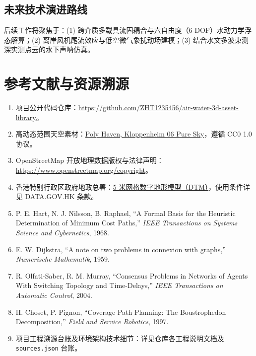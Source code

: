 \documentclass[UTF8,a4paper,11pt,fontset=fandol]{ctexart}
\newcommand{\repo}{https://github.com/ZHT1235456/air-water-3d-asset-library}
\begin{document}
\subsection{未来技术演进路线}
后续工作将聚焦于：(1) 跨介质多载具流固耦合与六自由度（6-DOF）水动力学浮态解算；(2) 离岸风机尾流效应与低空微气象扰动场建模；(3) 结合水文多波束测深实测点云的水下声呐仿真。

\section*{参考文献与资源溯源}
\begin{enumerate}\small
\item 项目公开代码仓库：\url{\repo}。
\item 高动态范围天空素材：\href{https://polyhaven.com/a/kloppenheim_06_puresky}{Poly Haven, Kloppenheim 06 Pure Sky}，遵循 CC0 1.0 协议。
\item OpenStreetMap 开放地理数据版权与法律声明：\url{https://www.openstreetmap.org/copyright}。
\item 香港特别行政区政府地政总署：\href{https://data.gov.hk/en-data/dataset/hk-landsd-openmap-5m-grid-dtm}{5 米网格数字地形模型（DTM）}，使用条件详见 DATA.GOV.HK 条款。
\item P. E. Hart, N. J. Nilsson, B. Raphael, ``A Formal Basis for the Heuristic Determination of Minimum Cost Paths,'' \textit{IEEE Transactions on Systems Science and Cybernetics}, 1968.
\item E. W. Dijkstra, ``A note on two problems in connexion with graphs,'' \textit{Numerische Mathematik}, 1959.
\item R. Olfati-Saber, R. M. Murray, ``Consensus Problems in Networks of Agents With Switching Topology and Time-Delays,'' \textit{IEEE Transactions on Automatic Control}, 2004.
\item H. Choset, P. Pignon, ``Coverage Path Planning: The Boustrophedon Decomposition,'' \textit{Field and Service Robotics}, 1997.
\item 项目工程溯源台账及环境架构技术细节：详见仓库各工程说明文档及 \texttt{sources.json} 台账。
\end{enumerate}

\vfill
\noindent{\color{sea}\rule{\linewidth}{0.6pt}}
\vspace{1mm}
\end{document}
